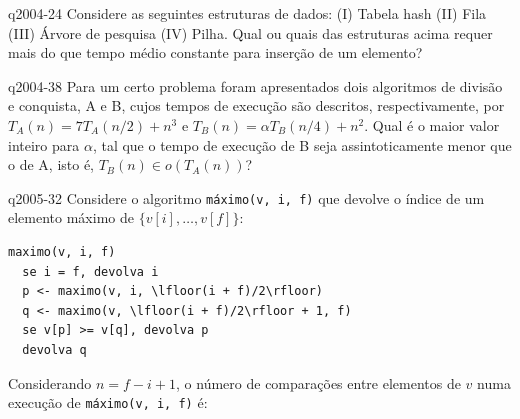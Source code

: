\documentclass[10pt,a4paper]{article}
\begin{document}
{
\def\AMCbeginQuestion#1#2{\par\noindent{\bf (POSCOMP 2004 - Questão 24)}}
\begin{question}{q2004-24} Considere as seguintes estruturas de dados: (I) Tabela hash (II) Fila (III) Árvore de pesquisa (IV) Pilha. Qual ou quais das estruturas acima requer mais do que tempo médio constante para inserção de um elemento?
\begin{choices}
\end{choices}
\end{question}
}

{
\def\AMCbeginQuestion#1#2{\par\noindent{\bf (POSCOMP 2004 - Questão 38)}}
\begin{question}{q2004-38} Para um certo problema foram apresentados dois algoritmos de divisão e conquista, A e B, cujos tempos de execução são descritos, respectivamente, por $T_A(n) = 7 T_A(n/2) + n^3$ e $T_B(n) = \alpha T_B(n/4) + n^2$. Qual é o maior valor inteiro para $\alpha$, tal que o tempo de execução de B seja assintoticamente menor que o de A, isto é, $T_B(n) \in o(T_A(n))$?
\begin{choices}
\end{choices}
\end{question}
}

{
\def\AMCbeginQuestion#1#2{\par\noindent{\bf (POSCOMP 2005 - Questão 32)}}
\begin{question}{q2005-32} Considere o algoritmo \texttt{máximo(v, i, f)} que devolve o índice de um elemento máximo de $\{v[i], \dots, v[f]\}$:
\begin{lstlisting}
maximo(v, i, f)
  se i = f, devolva i
  p <- maximo(v, i, \lfloor(i + f)/2\rfloor)
  q <- maximo(v, \lfloor(i + f)/2\rfloor + 1, f)
  se v[p] >= v[q], devolva p
  devolva q
\end{lstlisting}
Considerando $n = f - i + 1$, o número de comparações entre elementos de $v$ numa execução de \texttt{máximo(v, i, f)} é:
\begin{choices}
\end{choices}
\end{question}
}
\end{document}

